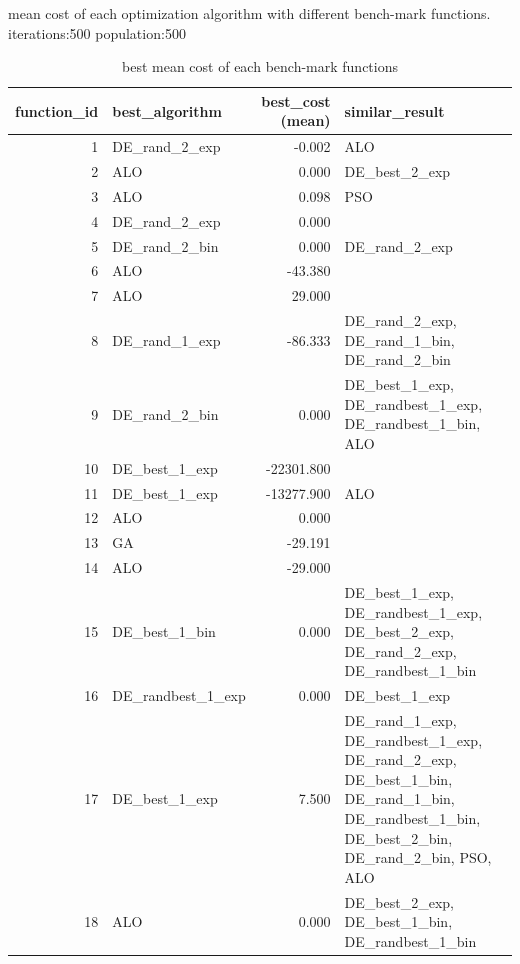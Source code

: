 \documentclass[12pt]{article}
\begin{document}
\begin{table}[H]
\begin{adjustbox}{width=1\textwidth}
    \end{adjustbox}
    \caption{mean cost of each optimization algorithm with different bench-mark functions. iterations:500 population:500} 
    \label{tab:summary}
\end{table}



\begin{table}[H]
    \centering
    \scriptsize
    
    
\begin{tabular}{rlrp{}}
    \toprule
    function\_id &     best\_algorithm &  best\_cost (mean) &                                                                                                                            similar\_result \\
    \midrule
    1 &  DE\_rand\_2\_exp & -0.002 &  ALO \\
    2 &  ALO & 0.000 &  DE\_best\_2\_exp \\
    3 &  ALO & 0.098 &  PSO \\
    4 &  DE\_rand\_2\_exp & 0.000 &   \\
    5 &  DE\_rand\_2\_bin & 0.000 &  DE\_rand\_2\_exp \\
    6 &  ALO & -43.380 &   \\
    7 &  ALO & 29.000 &   \\
    8 &  DE\_rand\_1\_exp & -86.333 &  DE\_rand\_2\_exp, DE\_rand\_1\_bin, DE\_rand\_2\_bin \\
    9 &  DE\_rand\_2\_bin & 0.000 &  DE\_best\_1\_exp, DE\_randbest\_1\_exp, DE\_randbest\_1\_bin, ALO \\
    10 &  DE\_best\_1\_exp & -22301.800 &   \\
    11 &  DE\_best\_1\_exp & -13277.900 &  ALO \\
    12 &  ALO & 0.000 &   \\
    13 &  GA & -29.191 &   \\
    14 &  ALO & -29.000 &   \\
    15 &  DE\_best\_1\_bin & 0.000 &  DE\_best\_1\_exp, DE\_randbest\_1\_exp, DE\_best\_2\_exp, DE\_rand\_2\_exp, DE\_randbest\_1\_bin \\
    16 &  DE\_randbest\_1\_exp & 0.000 &  DE\_best\_1\_exp \\
    17 &  DE\_best\_1\_exp & 7.500 &  DE\_rand\_1\_exp, DE\_randbest\_1\_exp, DE\_rand\_2\_exp, DE\_best\_1\_bin, DE\_rand\_1\_bin, DE\_randbest\_1\_bin, DE\_best\_2\_bin, DE\_rand\_2\_bin, PSO, ALO \\
    18 &  ALO & 0.000 &  DE\_best\_2\_exp, DE\_best\_1\_bin, DE\_randbest\_1\_bin \\
    \bottomrule
\end{tabular}

    
    \caption{best mean cost of each bench-mark functions} 
    \label{tab:summary_best}
\end{table}
\end{document}
